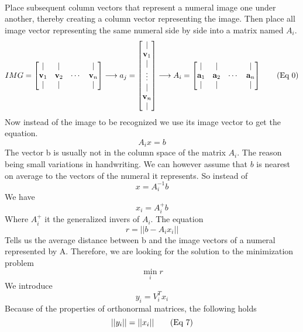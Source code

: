 \documentclass{article}
\begin{document}
	\paragraph{}
	Place subsequent column vectors that represent a numeral image one under another, thereby creating a column vector representing the image.
	Then place all image vector representing the same numeral side by side into a matrix named $A_i$. 
	\[
		IMG = \begin{bmatrix}
			\mid & \mid & & \mid \\
			{\bf v}_{1} & {\bf v}_{2} & \cdots & {\bf v}_{n}\\
			\mid & \mid & & \mid \\
			\end{bmatrix}
		\longrightarrow
		a_j = \begin{bmatrix}
			\mid   \\
			{\bf v}_{1} \\
			 \mid \\
			 \vdots \\
			\mid   \\
			{\bf v}_{n} \\
			 \mid \\
			\end{bmatrix}
		\longrightarrow
		A_i = \begin{bmatrix}
			\mid & \mid & & \mid \\
			{\bf a}_{1} & {\bf a}_{2} & \cdots & {\bf a}_{n}\\
			\mid & \mid & & \mid \\
			\end{bmatrix}
		\tag{Eq 0}
	\]
	Now instead of the image to be recognized we use its image vector to get the equation.
	\[
		A_ix = b \tag{Eq 1}
	\]
	The vector b is usually not in the column space of the matrix $A_i$. The reason being small variations in handwriting.
	We can however assume that $b$ is nearest on average to the vectors of the numeral it represents. So instead of
	\[
		x = A_i^{-1}b \tag{Eq 2}
	\]
	We have
	\[
		x_i = A_i^+b \tag{Eq 3}
	\]
	Where $A_i^+$ it the generalized invers of $A_i$.
	The equation 
	\[
		r = ||b - A_ix_i|| \tag{Eq 4}
	\]
	Tells us the average distance between b and the image vectors of a numeral represented by A.
	Therefore, we are looking for the solution to the minimization problem
	\[
		\min_{i}  r \tag{Eq 5}
	\]
	We introduce
	\[
		y_i = V_i^Tx_i \tag{Eq 6}
	\]
	Because of the properties of orthonormal matrices, the following holds
	\[
		||y_i|| = ||x_i||  \tag{Eq 7}\\
	\]
\end{document}
